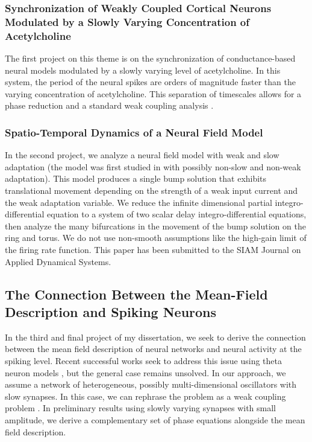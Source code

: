 \documentclass[a4paper,11pt]{article}
\begin{document}
\subsubsection{Synchronization of Weakly Coupled Cortical Neurons Modulated by a Slowly Varying Concentration of Acetylcholine}
The first project on this theme is on the synchronization of conductance-based neural models modulated by a slowly varying level of acetylcholine. In this system, the period of the neural spikes are orders of magnitude faster than the varying concentration of acetylcholine. This separation of timescales allows for a phase reduction and a standard weak coupling analysis \cite{park2016weakly}.

\subsubsection{Spatio-Temporal Dynamics of a Neural Field Model}
In the second project, we analyze a neural field model with weak and slow adaptation (the model was first studied in \cite{pinto_ermentrout_2001_siam} with possibly non-slow and non-weak adaptation). This model produces a single bump solution that exhibits translational movement depending on the strength of a weak input current and the weak adaptation variable. We reduce the infinite dimensional partial integro-differential equation to a system of two scalar delay integro-differential equations, then analyze the many bifurcations in the movement of the bump solution on the ring and torus. We do not use non-smooth assumptions like the high-gain limit of the firing rate function. This paper has been submitted to the SIAM Journal on Applied Dynamical Systems.

\subsection{The Connection Between the Mean-Field Description and Spiking Neurons}
In the third and final project of my dissertation, we seek to derive the connection between the mean field description of neural networks and neural activity at the spiking level. Recent successful works seek to address this issue using theta neuron models \cite{laing2014derivation}, but the general case remains unsolved. In our approach, we assume a network of heterogeneous, possibly multi-dimensional oscillators with slow synapses. In this case, we can rephrase the problem as a weak coupling problem \cite{rubinrubin}. In preliminary results using slowly varying synapses with small amplitude, we derive a complementary set of phase equations alongside the mean field description.
\end{document}
